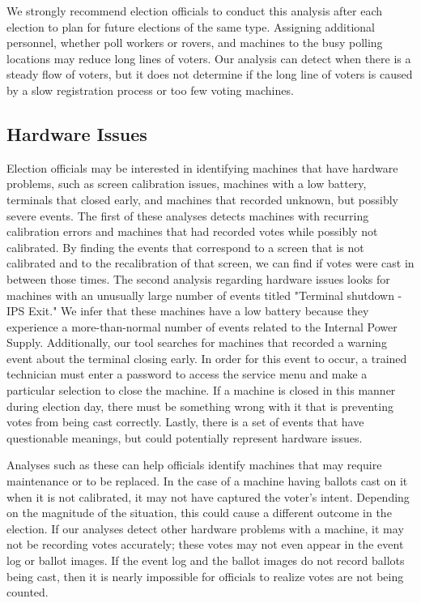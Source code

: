 We strongly recommend election officials to conduct this analysis after each election to plan for future elections of the same type. Assigning additional personnel, whether poll workers or rovers, and machines to the busy polling locations may reduce long lines of voters.  Our analysis can detect when there is a steady flow of voters, but it does not determine if the long line of voters is caused by a slow registration process or too few voting machines.

\subsection{Hardware Issues}
Election officials may be interested in identifying machines that have hardware problems, such as screen calibration issues, machines with a low battery, terminals that closed early, and machines that recorded unknown, but possibly severe events.  The first of these analyses detects machines with recurring calibration errors and machines that had recorded votes while possibly not calibrated.  By finding the events that correspond to a screen that is not calibrated and to the recalibration of that screen, we can find if votes were cast in between those times.  The second analysis regarding hardware issues looks for machines with an unusually large number of events titled "Terminal shutdown - IPS Exit."  We infer that these machines have a low battery because they experience a more-than-normal number of events related to the Internal Power Supply.  Additionally, our tool searches for machines that recorded a warning event about the terminal closing early.  In order for this event to occur, a trained technician must enter a password to access the service menu and make a particular selection to close the machine.  If a machine is closed in this manner during election day, there must be something wrong with it that is preventing votes from being cast correctly.  Lastly, there is a set of events that have questionable meanings, but could potentially represent hardware issues.  

Analyses such as these can help officials identify machines that may require maintenance or to be replaced.  In the case of a machine having ballots cast on it when it is not calibrated, it may not have captured the voter's intent.  Depending on the magnitude of the situation, this could cause a different outcome in the election.  If our analyses detect other hardware problems with a machine, it may not be recording votes accurately; these votes may not even appear in the event log or ballot images.  If the event log and the ballot images do not record ballots being cast, then it is nearly impossible for officials to realize votes are not being counted.  

